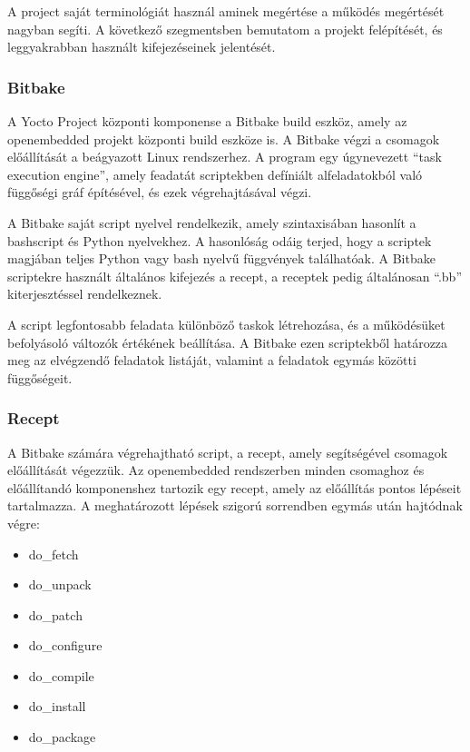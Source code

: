 A project saját terminológiát használ aminek megértése a működés megértését
nagyban segíti. A következő szegmentsben bemutatom a projekt felépítését, és
leggyakrabban használt kifejezéseinek jelentését.

\subsubsection{Bitbake}

A Yocto Project központi komponense a Bitbake build eszköz, amely az openembedded
projekt központi build eszköze is. A Bitbake végzi a csomagok előállítását a
beágyazott Linux rendszerhez.  A program egy úgynevezett ``task execution
engine'', amely feadatát scriptekben defíniált alfeladatokból való függőségi gráf
építésével, és ezek végrehajtásával végzi.

\medskip

A Bitbake saját script nyelvel rendelkezik, amely szintaxisában hasonlít a
bashscript és Python nyelvekhez. A hasonlóság odáig terjed, hogy a scriptek
magjában teljes Python vagy bash nyelvű függvények találhatóak. A Bitbake
scriptekre használt általános kifejezés a recept, a receptek pedig általánosan
``.bb'' kiterjesztéssel rendelkeznek.

A script legfontosabb feladata különböző taskok létrehozása, és a működésüket
befolyásoló változók értékének beállítása. A Bitbake ezen scriptekből határozza
meg az elvégzendő feladatok listáját, valamint a feladatok egymás közötti
függőségeit. 

\subsubsection{Recept}

A Bitbake számára végrehajtható script, a recept, amely segítségével csomagok
előállítását végezzük. Az openembedded rendszerben minden csomaghoz és
előállítandó komponenshez tartozik egy recept, amely az előállítás pontos
lépéseit tartalmazza. A meghatározott lépések szigorú sorrendben egymás után
hajtódnak végre:

\begin{itemize}
\item{do\_fetch}
\item{do\_unpack}
\item{do\_patch}
\item{do\_configure}
\item{do\_compile}
\item{do\_install}
\item{do\_package}
\end{itemize}


